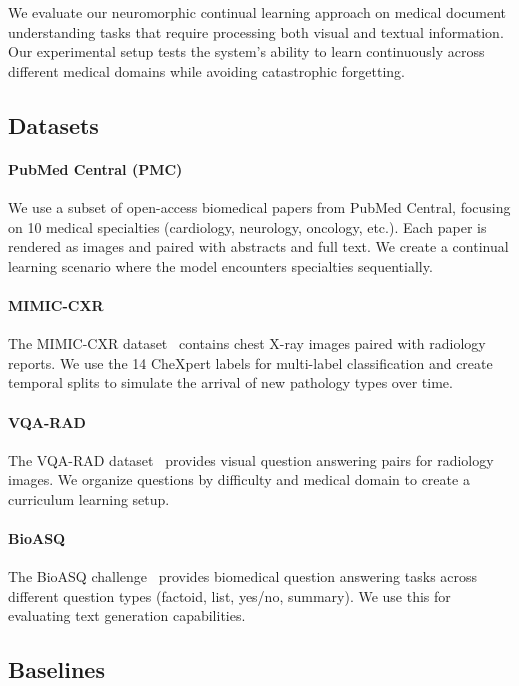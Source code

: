 \documentclass{article}
\begin{document}
We evaluate our neuromorphic continual learning approach on medical document understanding tasks that require processing both visual and textual information. Our experimental setup tests the system's ability to learn continuously across different medical domains while avoiding catastrophic forgetting.

\subsection{Datasets}

\paragraph{PubMed Central (PMC)} We use a subset of open-access biomedical papers from PubMed Central, focusing on 10 medical specialties (cardiology, neurology, oncology, etc.). Each paper is rendered as images and paired with abstracts and full text. We create a continual learning scenario where the model encounters specialties sequentially.

\paragraph{MIMIC-CXR} The MIMIC-CXR dataset~\cite{johnson2019mimic} contains chest X-ray images paired with radiology reports. We use the 14 CheXpert labels for multi-label classification and create temporal splits to simulate the arrival of new pathology types over time.

\paragraph{VQA-RAD} The VQA-RAD dataset~\cite{lau2018dataset} provides visual question answering pairs for radiology images. We organize questions by difficulty and medical domain to create a curriculum learning setup.

\paragraph{BioASQ} The BioASQ challenge~\cite{tsatsaronis2015overview} provides biomedical question answering tasks across different question types (factoid, list, yes/no, summary). We use this for evaluating text generation capabilities.

\subsection{Baselines}
\end{document}
